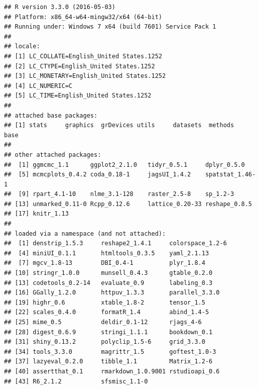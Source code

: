 \documentclass[]{book}
\begin{document}
\begin{verbatim}
## R version 3.3.0 (2016-05-03)
## Platform: x86_64-w64-mingw32/x64 (64-bit)
## Running under: Windows 7 x64 (build 7601) Service Pack 1
## 
## locale:
## [1] LC_COLLATE=English_United States.1252 
## [2] LC_CTYPE=English_United States.1252   
## [3] LC_MONETARY=English_United States.1252
## [4] LC_NUMERIC=C                          
## [5] LC_TIME=English_United States.1252    
## 
## attached base packages:
## [1] stats     graphics  grDevices utils     datasets  methods   base     
## 
## other attached packages:
##  [1] ggmcmc_1.1      ggplot2_2.1.0   tidyr_0.5.1     dplyr_0.5.0    
##  [5] mcmcplots_0.4.2 coda_0.18-1     jagsUI_1.4.2    spatstat_1.46-1
##  [9] rpart_4.1-10    nlme_3.1-128    raster_2.5-8    sp_1.2-3       
## [13] unmarked_0.11-0 Rcpp_0.12.6     lattice_0.20-33 reshape_0.8.5  
## [17] knitr_1.13     
## 
## loaded via a namespace (and not attached):
##  [1] denstrip_1.5.3     reshape2_1.4.1     colorspace_1.2-6  
##  [4] miniUI_0.1.1       htmltools_0.3.5    yaml_2.1.13       
##  [7] mgcv_1.8-13        DBI_0.4-1          plyr_1.8.4        
## [10] stringr_1.0.0      munsell_0.4.3      gtable_0.2.0      
## [13] codetools_0.2-14   evaluate_0.9       labeling_0.3      
## [16] GGally_1.2.0       httpuv_1.3.3       parallel_3.3.0    
## [19] highr_0.6          xtable_1.8-2       tensor_1.5        
## [22] scales_0.4.0       formatR_1.4        abind_1.4-5       
## [25] mime_0.5           deldir_0.1-12      rjags_4-6         
## [28] digest_0.6.9       stringi_1.1.1      bookdown_0.1      
## [31] shiny_0.13.2       polyclip_1.5-6     grid_3.3.0        
## [34] tools_3.3.0        magrittr_1.5       goftest_1.0-3     
## [37] lazyeval_0.2.0     tibble_1.1         Matrix_1.2-6      
## [40] assertthat_0.1     rmarkdown_1.0.9001 rstudioapi_0.6    
## [43] R6_2.1.2           sfsmisc_1.1-0
\end{verbatim}


\end{document}
